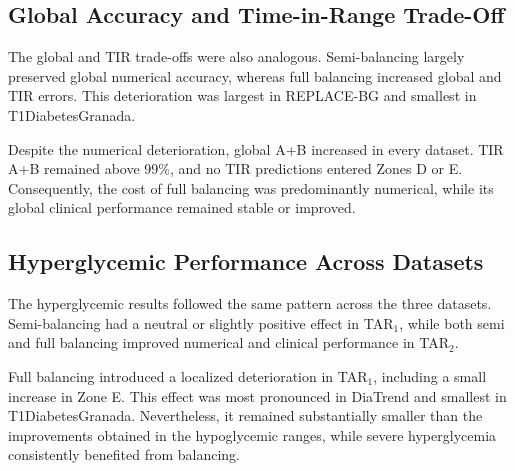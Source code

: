 \subsection{Global Accuracy and Time-in-Range Trade-Off}
\label{subsec:cross_dataset_global_tradeoff}

The global and TIR trade-offs were also analogous. Semi-balancing largely preserved global numerical accuracy, whereas full balancing increased global and TIR errors. This deterioration was largest in REPLACE-BG and smallest in T1DiabetesGranada.

Despite the numerical deterioration, global A+B increased in every dataset. TIR A+B remained above 99\%, and no TIR predictions entered Zones D or E. Consequently, the cost of full balancing was predominantly numerical, while its global clinical performance remained stable or improved.

\subsection{Hyperglycemic Performance Across Datasets}
\label{subsec:cross_dataset_hyperglycemia}

The hyperglycemic results followed the same pattern across the three datasets. Semi-balancing had a neutral or slightly positive effect in TAR$_1$, while both semi and full balancing improved numerical and clinical performance in TAR$_2$.

Full balancing introduced a localized deterioration in TAR$_1$, including a small increase in Zone E. This effect was most pronounced in DiaTrend and smallest in T1DiabetesGranada. Nevertheless, it remained substantially smaller than the improvements obtained in the hypoglycemic ranges, while severe hyperglycemia consistently benefited from balancing.
